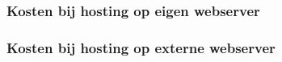 \subsubsection{Kosten bij hosting op eigen webserver}


\subsubsection{Kosten bij hosting op externe webserver}
